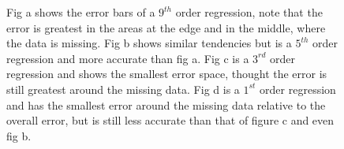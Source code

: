 \documentclass[10pt]{article}
\begin{document}
\begin{itemize}
\begin{figure}[htb]
\begin{center}


\caption{Fig a shows the error bars of a $9^{th}$ order regression, note that the error is greatest in the areas at the edge and in the middle, where the data is missing.  Fig b shows similar tendencies but is a $5^{th}$ order regression and more accurate than fig a. Fig c is a $3^{rd}$ order regression and shows the smallest error space, thought the error is still greatest around the missing data.  Fig d is a $1^{st}$ order regression and has the smallest error around the missing data relative to the overall error, but is still less accurate than that of figure c and even fig b. }
\end{center}
\end{figure}


\end{itemize}
\end{document}

